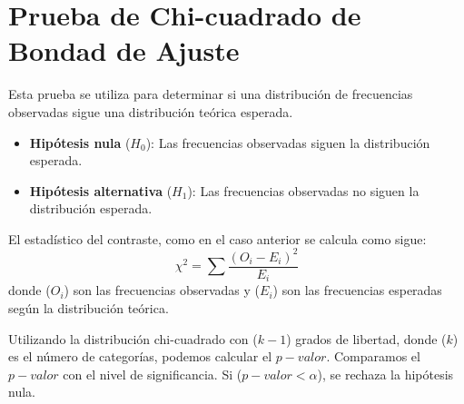 \documentclass[
  letterpaper,
  DIV=11,
  numbers=noendperiod]{scrreprt}
\providecommand{\tightlist}{%
  \setlength{\itemsep}{0pt}\setlength{\parskip}{0pt}}\usepackage{longtable,booktabs,array}
\begin{document}
\hypertarget{prueba-de-chi-cuadrado-de-bondad-de-ajuste}{%
\section{Prueba de Chi-cuadrado de Bondad de
Ajuste}\label{prueba-de-chi-cuadrado-de-bondad-de-ajuste}}

Esta prueba se utiliza para determinar si una distribución de
frecuencias observadas sigue una distribución teórica esperada.

\begin{itemize}
\tightlist
\item
  \textbf{Hipótesis nula} (\(H_0\)): Las frecuencias observadas siguen
  la distribución esperada.
\item
  \textbf{Hipótesis alternativa} (\(H_1\)): Las frecuencias observadas
  no siguen la distribución esperada.
\end{itemize}

El estadístico del contraste, como en el caso anterior se calcula como
sigue: \[ \chi^2 = \sum \frac{(O_i - E_i)^2}{E_i}\] donde (\(O_i\)) son
las frecuencias observadas y (\(E_i\)) son las frecuencias esperadas
según la distribución teórica.

Utilizando la distribución chi-cuadrado con (\(k-1\)) grados de
libertad, donde (\(k\)) es el número de categorías, podemos calcular el
\(p-valor\). Comparamos el \(p-valor\) con el nivel de significancia. Si
(\(p-valor < \alpha\)), se rechaza la hipótesis nula.
\end{document}
